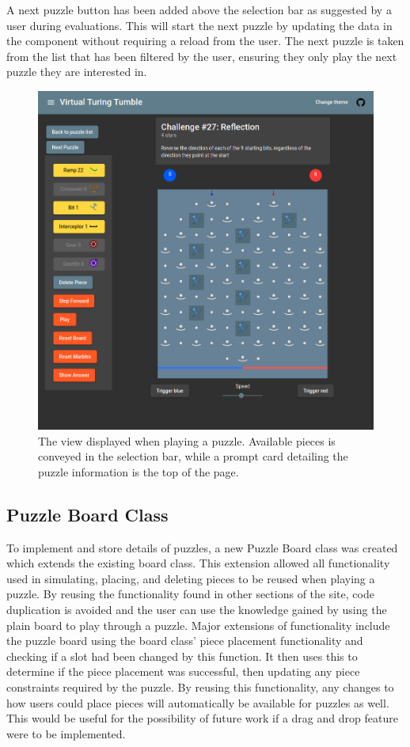 \documentclass{l4proj}
\begin{document}

A next puzzle button has been added above the selection bar as suggested by a user during evaluations. This will start the next puzzle by updating the data in the component without requiring a reload from the user. The next puzzle is taken from the list that has been filtered by the user, ensuring they only play the next puzzle they are interested in.

\begin{figure}
    \centering
    \includegraphics[width=0.65\linewidth]{images/puzzle.png}
    \caption{The view displayed when playing a puzzle. Available pieces is conveyed in the selection bar, while a prompt card detailing the puzzle information is the top of the page.}
    \label{fig:puzzle}
\end{figure}

\subsection{Puzzle Board Class}
\label{section:puzzle-board-class}
To implement and store details of puzzles, a new Puzzle Board class was created which extends the existing board class. This extension allowed all functionality used in simulating, placing, and deleting pieces to be reused when playing a puzzle. By reusing the functionality found in other sections of the site, code duplication is avoided and the user can use the knowledge gained by using the plain board to play through a puzzle. Major extensions of functionality include the puzzle board using the board class' piece placement functionality and checking if a slot had been changed by this function. It then uses this to determine if the piece placement was successful, then updating any piece constraints required by the puzzle. By reusing this functionality, any changes to how users could place pieces will automatically be available for puzzles as well. This would be useful for the possibility of future work if a drag and drop feature were to be implemented. 
\end{document}
